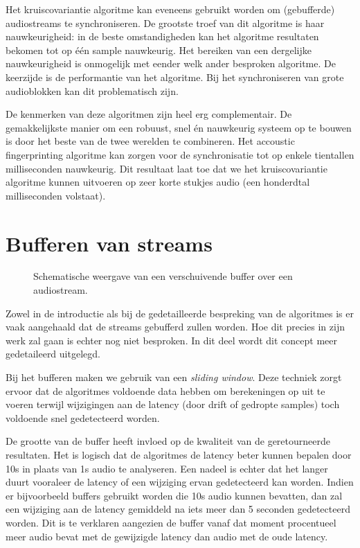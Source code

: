 Het kruiscovariantie algoritme kan eveneens gebruikt worden om (gebufferde) audiostreams te synchroniseren. De grootste troef van dit algoritme is haar nauwkeurigheid: in de beste omstandigheden kan het algoritme resultaten bekomen tot op één sample nauwkeurig. Het bereiken van een dergelijke nauwkeurigheid is onmogelijk met eender welk ander besproken algoritme. De keerzijde is de performantie van het algoritme. Bij het synchroniseren van grote audioblokken kan dit problematisch zijn.

De kenmerken van deze algoritmen zijn heel erg complementair. De gemakkelijkste manier om een robuust, snel én nauwkeurig systeem op te bouwen is door het beste van de twee werelden te combineren. Het accoustic fingerprinting algoritme kan zorgen voor de synchronisatie tot op enkele tientallen milliseconden nauwkeurig. Dit resultaat laat toe dat we het kruiscovariantie algoritme kunnen uitvoeren op zeer korte stukjes audio (een honderdtal milliseconden volstaat).

\section{Bufferen van streams}

\begin{figure}[h!]
	\captionsetup{width=0.7\textwidth}
	\caption[Schematische weergave van de buffer]{Schematische weergave van een verschuivende buffer over een audiostream.}
	\begin{center}
		\advance\parskip0.3cm
		
	\end{center}
\end{figure}

Zowel in de introductie als bij de gedetailleerde bespreking van de algoritmes is er vaak aangehaald dat de streams gebufferd zullen worden. Hoe dit precies in zijn werk zal gaan is echter nog niet besproken. In dit deel wordt dit concept meer gedetaileerd uitgelegd.

Bij het bufferen maken we gebruik van een \textit{sliding window}. Deze techniek zorgt ervoor dat de algoritmes voldoende data hebben om berekeningen op uit te voeren terwijl wijzigingen aan de latency (door drift of gedropte samples) toch voldoende snel gedetecteerd worden.

De grootte van de buffer heeft invloed op de kwaliteit van de geretourneerde resultaten. Het is logisch dat de algoritmes de latency beter kunnen bepalen door 10s in plaats van 1s audio te analyseren. Een nadeel is echter dat het langer duurt vooraleer de latency of een wijziging ervan gedetecteerd kan worden. Indien er bijvoorbeeld buffers gebruikt worden die 10s audio kunnen bevatten, dan zal een wijziging aan de latency gemiddeld na iets meer dan 5 seconden gedetecteerd worden. Dit is te verklaren aangezien de buffer vanaf dat moment procentueel meer audio bevat met de gewijzigde latency dan audio met de oude latency.

